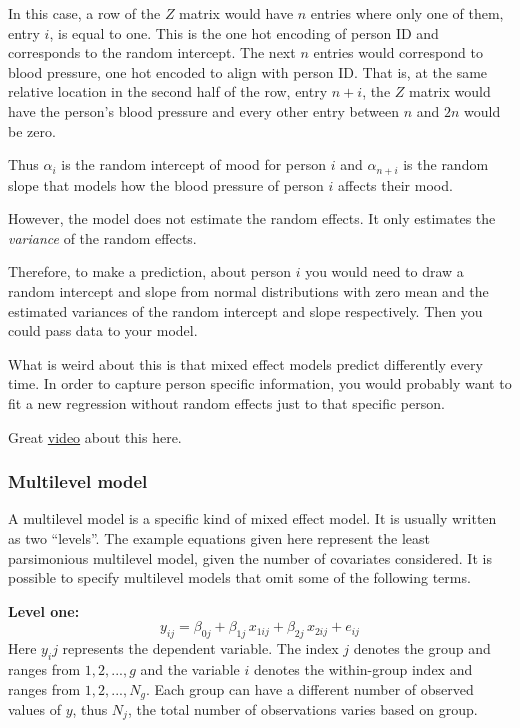 \documentclass[
]{article}
\begin{document}
In this case, a row of the \(Z\) matrix would have \(n\) entries where
only one of them, entry \(i\), is equal to one. This is the one hot
encoding of person ID and corresponds to the random intercept. The next
\(n\) entries would correspond to blood pressure, one hot encoded to
align with person ID. That is, at the same relative location in the
second half of the row, entry \(n + i\), the \(Z\) matrix would have the
person's blood pressure and every other entry between \(n\) and \(2n\)
would be zero.

Thus \(\alpha_i\) is the random intercept of mood for person \(i\) and
\(\alpha_{n+i}\) is the random slope that models how the blood pressure
of person \(i\) affects their mood.

However, the model does not estimate the random effects. It only
estimates the \emph{variance} of the random effects.

Therefore, to make a prediction, about person \(i\) you would need to
draw a random intercept and slope from normal distributions with zero
mean and the estimated variances of the random intercept and slope
respectively. Then you could pass data to your model.

What is weird about this is that mixed effect models predict differently
every time. In order to capture person specific information, you would
probably want to fit a new regression without random effects just to
that specific person.

Great \href{https://www.youtube.com/watch?v=n_lz5I4POqk\&t=219s}{video}
about this here.

\hypertarget{multilevel-model}{%
\subsubsection{Multilevel model}\label{multilevel-model}}

A multilevel model is a specific kind of mixed effect model. It is
usually written as two ``levels''. The example equations given here
represent the least parsimonious multilevel model, given the number of
covariates considered. It is possible to specify multilevel models that
omit some of the following terms.

\textbf{Level one:} \[
y_{ij} = \beta_{0j} + \beta_{1j} \, x_{1ij} + \beta_{2j}\, x_{2ij} + e_{ij}
\] Here \(y_ij\) represents the dependent variable. The index \(j\)
denotes the group and ranges from \(1, 2, ..., g\) and the variable
\(i\) denotes the within-group index and ranges from \(1, 2, ..., N_g\).
Each group can have a different number of observed values of \(y\), thus
\(N_j\), the total number of observations varies based on group.
\end{document}
